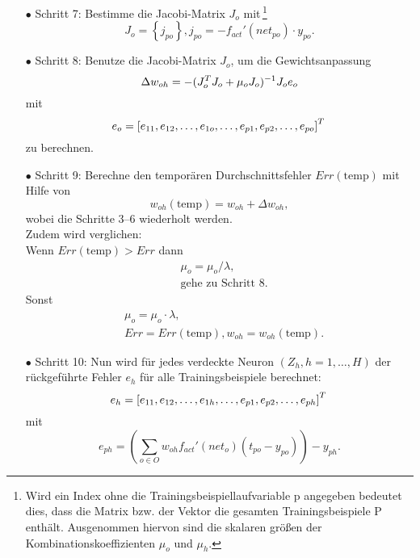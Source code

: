 \begin{itemize}
\item[\textbf{$\bullet$}] Schritt 7: Bestimme die Jacobi-Matrix $J_{o}$ mit\,\footnote{Wird ein Index ohne die Trainingsbeispiellaufvariable p angegeben bedeutet dies, dass die Matrix bzw. der Vektor die gesamten Trainingsbeispiele P enthält. Ausgenommen hiervon sind die skalaren größen der Kombinationskoeffizienten $\mu_o$ und $\mu_h$.}
\begin{equation}
J_{o}= \left \{ j_{po} \right \}, j_{po}=-f_{act}'(net_{po}) \cdot y_{po}.
\end{equation}

\item[\textbf{$\bullet$}] Schritt 8: Benutze die Jacobi-Matrix $J_{o}$, um die Gewichtsanpassung
\begin{equation}
\Delta w_{oh}=-(J_{o}^T J_{o} + \mu_{o} J_{o})^{-1} J_{o} e_{o}\\
\end{equation}
mit
\begin{equation}
e_{o}= \left [ e_{11}, e_{12}, \dots, e_{1o}, \dots, e_{p1}, e_{p2}, \dots, e_{po} \right ]^T\\
\end{equation}
zu berechnen.

\item[\textbf{$\bullet$}] Schritt 9: Berechne den temporären Durchschnittsfehler $Err(\text{temp})$ mit Hilfe von
\begin{equation}
w_{oh}(\text{temp})= w_{oh} + \Delta w_{oh},
\end{equation}
wobei die Schritte 3--6 wiederholt werden.\\
Zudem wird verglichen:\\
Wenn $Err(\text{temp}) > Err$ dann
\begin{align*}
&\mu_o = \mu_o / \lambda, \\
&\text{gehe zu Schritt 8.}
\end{align*}
Sonst
\begin{align*}
&\mu_o = \mu_o \cdot \lambda, \\
&Err=Err(\text{temp}), w_{oh}=w_{oh}(\text{temp}).
\end{align*}

\item[\textbf{$\bullet$}] Schritt 10: Nun wird für jedes verdeckte Neuron $(Z_h,h=1,\dots,H)$ der rückgeführte Fehler $e_{h}$ für alle Trainingsbeispiele berechnet:
\begin{equation}
e_{h}= \left [ e_{11}, e_{12}, \dots, e_{1h}, \dots, e_{p1}, e_{p2}, \dots, e_{ph} \right ]^T\\
\end{equation}
mit
\begin{equation}
e_{ph} = \left (    \sum\limits_{o \in O} w_{oh} f_{act}'(net_{o}) (t_{po}-y_{po})  \right )  - y_{ph}.
\end{equation}



\end{itemize}
